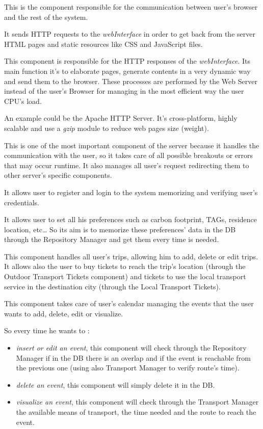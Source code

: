 This is the component responsible for the communication between user's browser and the rest of the system.\par
It sends HTTP requests to the \emph{webInterface} in order to get back from the server HTML pages and static resources like CSS and JavaScript files.

This component is responsible for the HTTP responses of the \emph{webInterface}. Its main function it’s to elaborate pages, generate contents in a very dynamic way and send them to the browser. These processes are performed by the Web Server instead of the user's Browser for managing in the most efficient way the user CPU's load.\par
An example could be the Apache HTTP Server. It’s cross-platform, highly scalable and use a \emph{gzip} module to reduce web pages size (weight).

This is one of the most important component of the server because it handles the communication with the user, so it takes care of all possible breakouts or errors that may occur runtime. It also manages all user’s request redirecting them to other server’s specific components.

It allows user to register and login to the system memorizing and verifying user’s credentials.

It allows user to set all his preferences such as carbon footprint, TAGs, residence location, etc… So its aim is to memorize these preferences’ data in the DB through the Repository Manager and get them every time is needed.

This component handles all user’s trips, allowing him to add, delete or edit trips. It allows also the user to buy tickets to reach the trip’s location (through the Outdoor Transport Tickets component) and tickets to use the local transport service in the destination city (through the Local Transport Tickets).

This component takes care of user’s calendar managing the events that the user wants to add, delete, edit or visualize.\par
So every time he wants to :
\begin{itemize}
	\setlength{\leftskip}{1cm}
	\item \emph{insert or edit an event}, this component will check through the Repository Manager if in the DB there is an overlap and if the event is reachable from the previous one (using also Transport Manager to verify route’s time).
	\item \emph{delete an event}, this component will simply delete it in the DB.
	\item \emph{visualize an event}, this component will check through the Transport Manager the available means of transport, the time needed and the route to reach the event.
\end{itemize}

